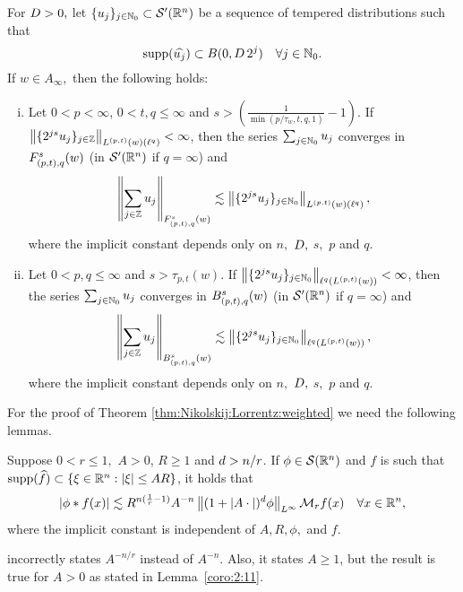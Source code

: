 {{{{{{\begin{theorem}\label{thm:Nikolskij:Lorrentz:weighted} For $\A> 0,$ let $\{u_j\}_{j \in \naz} \subset \mathcal{S}'(\rn)$ be a sequence of tempered distributions such that
\begin{equation*}
\supp(\widehat{u_j}) \subset B(0, \A\, 2^j ) \quad \forall j \in \naz.
\end{equation*}
If $w\in A_\infty,$ then the following holds:  
\begin{enumerate}[(i)]
\item\label{item:thh:Nikolskij:Lorrentz:TL} Let $0 < p < \infty$, $0 < t,q \leq \infty$ and $s > \left(\frac{1}{\min(p/\tau_w,t,q,1)} - 1 \right)$. If $\norm{\{2^{js} u_j\}_{j\in\ent}}{L^{(p,t)}(w)(\ell^{q})} < \infty$, then the series $\sum_{j \in \naz} u_j$ converges in $\itlw{(p,t)}{s}{q}{w}$ (in $\mathcal{S}'(\rn)$ if $q=\infty$) and 
\begin{equation*}
\norm{\sum_{j \in \ent} u_j}{\itlw{(p,t)}{s}{q}{w}} \lesssim  \norm{\{2^{js} u_j\}_{j\in\naz}}{L^{(p,t)}(w)(\ell^{q})},
\end{equation*}
where the implicit constant depends only on $n,$ $\A,$ $s,$ $p$ and  $q.$
\item\label{item:thh:Nikolskij:Lorrentz:B} Let $0 < p, q \leq \infty$ and $s > \tau_{p,t}(w)$. If $\norm{\{2^{js} u_j\}_{j\in\naz}}{\ell^{q}(L^{(p,t)}(w))} < \infty$, then the series $\sum_{j \in \naz} u_j$ converges in  $\ibesw{(p,t)}{s}{q}{w}$ (in $\mathcal{S}'(\rn)$ if $q=\infty$) and 
\begin{equation*}
\norm{\sum_{j \in \ent} u_j}{\ibesw{(p,t)}{s}{q}{w}} \lesssim  \norm{\{2^{js} u_j\}_{j\in\naz}}{\ell^{q}(L^{(p,t)}(w))},
\end{equation*}
where the implicit constant depends only on $n,$ $\A,$ $s,$ $p$ and $q.$
\end{enumerate}
\end{theorem}
For the proof of Theorem \ref{thm:Nikolskij:Lorrentz:weighted} we need the following lemmas.

\begin{lemma}\label{coro:2:11}
Suppose $0 < r \leq 1,$  $A >0$, $R \geq 1$ and $\ex > n/r$. If $\phi \in \sw$ and $f$ is such that  $\supp(\widehat{f}) \subset \{\xi\in\rn:\abs{\xi}\le AR\}$, it holds that
\begin{equation*}
|\phi * f(x)| \lesssim R^{n (\frac{1}{r}  -1)} A^{-n} \norm{(1 + |A \cdot|)^\ex \phi}{L^\infty}  \M_rf(x) \quad \forall x \in \rn,
\end{equation*}
where the implicit constant is independent of $A, R, \phi,$ and $f.$  
\end{lemma}
\begin{remark} \cite[Corollary 2.11]{MR837335} incorrectly states $A^{-n/r}$ instead of $ A^{-n}$. Also, it states $A \geq 1$, but the result is true for $A >0$ as stated in Lemma~\ref{coro:2:11}.
\end{remark}

}}}}}}
